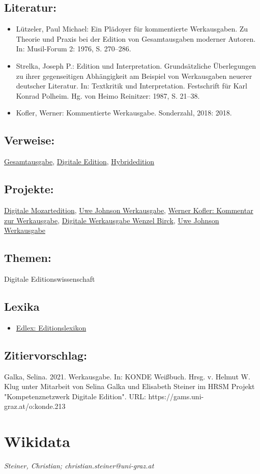 \documentclass{article}
\begin{document}
        \subsection*{Literatur:}\begin{itemize}\item Lützeler, Paul Michael: Ein Plädoyer für kommentierte Werkausgaben. Zu Theorie und Praxis bei der Edition von Gesamtausgaben moderner Autoren. In: Musil-Forum 2: 1976, S. 270–286.\item Strelka, Joseph P.: Edition und Interpretation. Grundsätzliche Überlegungen zu ihrer gegenseitigen Abhängigkeit am Beispiel von Werkausgaben neuerer deutscher Literatur. In: Textkritik und Interpretation. Festschrift für Karl Konrad Polheim. Hg. von Heimo Reinitzer: 1987, S. 21–38.\item Kofler, Werner: Kommentierte Werkausgabe. Sonderzahl, 2018: 2018.\end{itemize}\subsection*{Verweise:}\href{https://gams.uni-graz.at/o:konde.91}{Gesamtausgabe}, \href{https://gams.uni-graz.at/o:konde.59}{Digitale Edition}, \href{https://gams.uni-graz.at/o:konde.96}{Hybridedition}\subsection*{Projekte:}\href{https://dme.mozarteum.at}{Digitale Mozartedition}, \href{http://www.uwe-johnson-werkausgabe.de}{Uwe Johnson Werkausgabe}, \href{https://gams.uni-graz.at/context:kofler}{Werner Kofler: Kommentar zur Werkausgabe}, \href{http://www.digital-musicology.at/de-at/edi_birck.html}{Digitale Werkausgabe Wenzel Birck}, \href{http://www.uwe-johnson-werkausgabe.de}{Uwe Johnson Werkausgabe}\subsection*{Themen:}Digitale Editionswissenschaft\subsection*{Lexika}\begin{itemize}\item \href{https://edlex.de/index.php?title=Werkausgabe}{Edlex: Editionslexikon}\end{itemize}\subsection*{Zitiervorschlag:}Galka, Selina. 2021. Werkausgabe. In: KONDE Weißbuch. Hrsg. v. Helmut W. Klug unter Mitarbeit von Selina Galka und Elisabeth Steiner im HRSM Projekt "Kompetenznetzwerk Digitale Edition". URL: https://gams.uni-graz.at/o:konde.213\newpage\section*{Wikidata} \emph{Steiner, Christian; christian.steiner@uni-graz.at }\\
        
\end{document}
